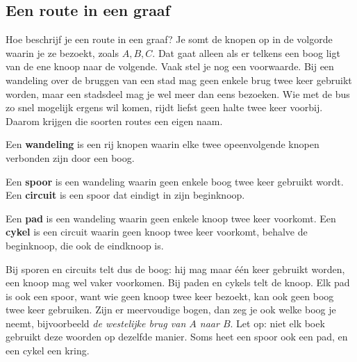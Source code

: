 \subsection{Een route in een graaf}

Hoe beschrijf je een route in een graaf? Je somt de knopen op in de volgorde waarin je ze bezoekt, zoals $A, B, C$. Dat gaat alleen als er telkens een boog ligt van de ene knoop naar de volgende. Vaak stel je nog een voorwaarde. Bij een wandeling over de bruggen van een stad mag geen enkele brug twee keer gebruikt worden, maar een stadsdeel mag je wel meer dan eens bezoeken. Wie met de bus zo snel mogelijk ergens wil komen, rijdt liefst geen halte twee keer voorbij. Daarom krijgen die soorten routes een eigen naam.

\begin{theorie}
Een \textbf{\textcolor{accent}{wandeling}} is een rij knopen waarin elke twee opeenvolgende knopen verbonden zijn door een boog.

Een \textbf{\textcolor{accent}{spoor}} is een wandeling waarin geen enkele boog twee keer gebruikt wordt. Een \textbf{\textcolor{accent}{circuit}} is een spoor dat eindigt in zijn beginknoop.

Een \textbf{\textcolor{accent}{pad}} is een wandeling waarin geen enkele knoop twee keer voorkomt. Een \textbf{\textcolor{accent}{cykel}} is een circuit waarin geen knoop twee keer voorkomt, behalve de beginknoop, die ook de eindknoop is.
\end{theorie}

Bij sporen en circuits telt dus de boog: hij mag maar één keer gebruikt worden, een knoop mag wel vaker voorkomen. Bij paden en cykels telt de knoop. Elk pad is ook een spoor, want wie geen knoop twee keer bezoekt, kan ook geen boog twee keer gebruiken. Zijn er meervoudige bogen, dan zeg je ook welke boog je neemt, bijvoorbeeld \textit{de westelijke brug van $A$ naar $B$}. Let op: niet elk boek gebruikt deze woorden op dezelfde manier. Soms heet een spoor ook een pad, en een cykel een kring.

